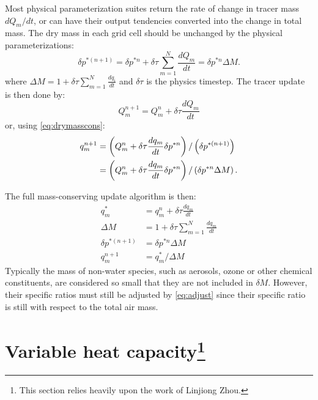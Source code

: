\documentclass[10pt,letterpaper,margin=1in]{memoir}
\begin{document}
Most physical parameterization suites return the rate of change in tracer mass $dQ_m/dt$, or can have their output tendencies converted into the change in total mass. 
The dry mass in each grid cell should be unchanged by the physical parameterizations:
\begin{equation} \label{eq:drymasscons}
\delta p^{*(n+1)} = \delta p^{*n} + \delta \tau  \sum_{m=1}^N \frac{dQ_m}{dt} = \delta p^{*n} \Delta M.
\end{equation}
where $\Delta M = 1 + \delta \tau \sum_{m=1}^N \frac{dq_i}{dt}$ and $\delta \tau$ is the physics timestep. The tracer update is then done by:
\begin{equation}
Q^{n+1}_m = Q^n_m + \delta \tau \frac{dQ_m}{dt}
\end{equation}
or, using \eqref{eq:drymasscons}:
\begin{align}
q^{n+1}_m &=  \left( Q^n_m + \delta \tau \frac{dq_m}{dt} \delta p^{*n} \right) / \left( \delta p^{*(n+1)} \right) \notag \\
&= \left( Q^n_m + \delta \tau \frac{dq_m}{dt} \delta p^{*n} \right) / \left( \delta p^{*n} \Delta M \right).
\end{align}

The full mass-conserving update algorithm is then:
\begin{subequations}
\begin{align}
q_m^* &= q_m^{n} + \delta \tau \frac{dq_m}{dt} \\
\Delta M &= 1 + \delta \tau \sum_{m=1}^N  \frac{dq_m}{dt}  \\
\delta p^{*(n+1)} &= \delta p^{*n} \Delta M \\
q_m^{n+1} &= q_m^{*} / \Delta M \label{eq:adjust}
\end{align}
\end{subequations}
Typically the mass of non-water species, such as aerosols, ozone or other chemical constituents, are considered so small that they are not included in $\delta M$. However, their specific ratios must still be adjusted by \eqref{eq:adjust} since their specific ratio is still with respect to the total air mass.

\section{Variable heat capacity\footnote{This section relies heavily upon the work of Linjiong Zhou.}} \label{sec:moistkappa}
\end{document}
